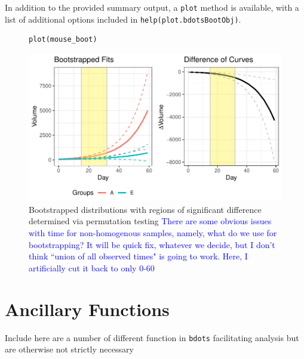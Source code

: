 \documentclass{article}
\providecommand{\cn}[1]{\textcolor{blue}{#1}}
\newcommand{\xt}{\texttt}%
\begin{document}
In addition to the provided summary output, a \xt{plot} method is available, with a list of additional options included in \xt{help(plot.bdotsBootObj)}.

\begin{figure}[H]
\centering
\begin{BVerbatim}
plot(mouse_boot)
\end{BVerbatim}

\includegraphics{img/mouse_boot_plot.pdf}
\caption{Bootstrapped distributions with regions of significant difference determined via permutation testing \cn{There are some obvious issues with time for non-homogenous samples, namely, what do we use for bootstrapping? It will be quick fix, whatever we decide, but I don't think ``union of all observed times" is going to work. Here, I artificially cut it back to only 0-60}}
\end{figure}
%
%
%
%


\section{Ancillary Functions}

Include here are a number of different function in \xt{bdots} facilitating  analysis but are otherwise not strictly necessary
\end{document}
